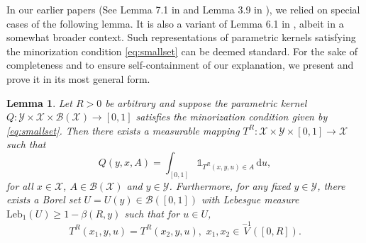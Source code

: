 \documentclass[a4paper,10pt]{article}
\newtheorem{lemma}[theorem]{Lemma}
\newcommand{\B}{\mathcal{B}}
\newcommand{\X}{\mathcal{X}}
\newcommand{\Y}{\mathcal{Y}}
\newcommand{\ind}{\mathds{1}}
\newcommand{\dint}{\mathrm{d}}  %
\newcommand{\leb}{\mathrm{Leb}}
\begin{document}
In our earlier papers (See Lemma 7.1 in \cite{lovas} and Lemma 3.9 in \cite{lovasCLT}), we relied on special cases of the following lemma. It is also a variant of Lemma 6.1 in \cite{rasonyi2018}, albeit in a somewhat broader context. Such representations of parametric kernels satisfying the minorization condition \eqref{eq:smallset} can be deemed standard. For the sake of completeness and to ensure self-containment of our explanation, we present and prove it in its most general form.
\begin{lemma}\label{lem:T}
	Let $R>0$ be arbitrary and suppose the parametric kernel $Q:\Y\times\X\times\B(\X)\to [0,1]$ satisfies the minorization condition given by \eqref{eq:smallset}. Then there exists a measurable mapping $T^R:\X\times\Y\times [0,1]\to\X$ such that
	$$
	Q(y,x,A)=\int_{[0,1]}\ind_{T^R (x,y,u)\in A}\,\dint u,
	$$
	for all $x\in\X$, $A\in\B(\X)$ and $y\in\Y$. 
	Furthermore, for any fixed $y\in\Y$, there exists a Borel set $U=U (y)\in \B ([0,1])$
	with Lebesgue measure
	$
	\leb_1 (U)\ge 1-\beta (R,y)
	$
	such that for $u\in U$,
	\begin{equation}\label{eq:Tconst}
	T^R (x_1,y,u) = T^R (x_2,y,u),\,\,x_1,x_2\in\stackrel{-1}{V}([0,R]).
	\end{equation}
\end{lemma}
\end{document}

